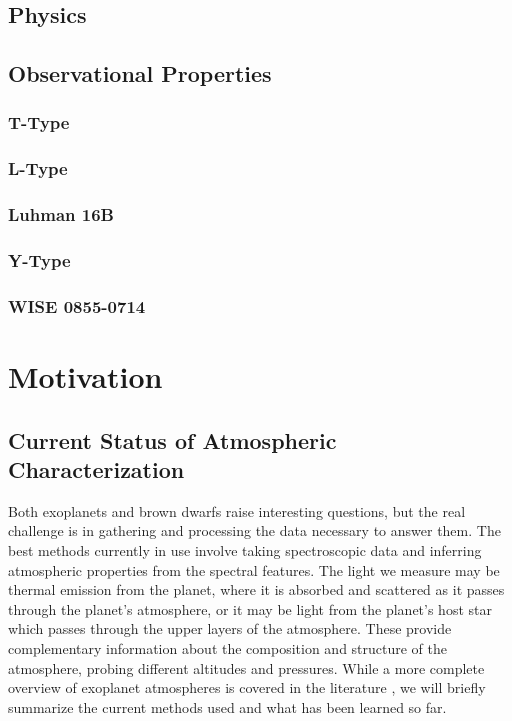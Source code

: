\subsection{Physics}
\subsection{Observational Properties}
\subsubsection{T-Type}
\subsubsection{L-Type}
\subsubsection{Luhman 16B}
\subsubsection{Y-Type}
\subsubsection{WISE 0855-0714}

\section{Motivation}
\subsection{Current Status of Atmospheric Characterization}
Both exoplanets and brown dwarfs raise interesting questions, but the real challenge is in gathering and processing the data necessary to answer them. 
The best methods currently in use involve taking spectroscopic data and inferring atmospheric properties from the spectral features.
The light we measure may be thermal emission from the planet, where it is absorbed and scattered as it passes through the planet's atmosphere, or it may be light from the planet's host star which passes through the upper layers of the atmosphere.
These provide complementary information about the composition and structure of the atmosphere, probing different altitudes and pressures.
While a more complete overview of exoplanet atmospheres is covered in the literature \parencite{Bozza,Madhusudhan2014,Seager2010}, we will briefly summarize the current methods used and what has been learned so far.
